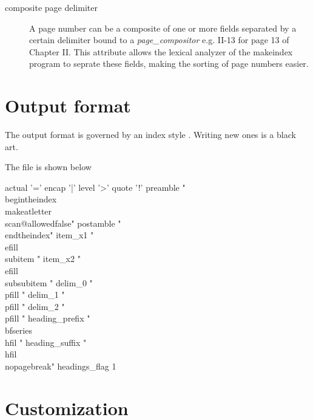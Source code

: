 \begin{description}

\item[composite page delimiter] A page number can be a composite of one or more fields separated by a certain delimiter bound to a \textit{page\_compositor}  e.g. II-13 for page 13 of Chapter II. This attribute allows the lexical analyzer of the makeindex program to seprate these fields, making the sorting of page numbers easier.
\end{description}


\section{Output format}

The output format is governed by an index style . Writing new ones is a black art.

The file  is shown below
\begin{teXXX}
actual '='
encap '|'
level '>'
quote '!'
preamble
"\n \\begin{theindex} \n \\makeatletter\\scan@allowedfalse\n"
postamble
"\n\n \\end{theindex}\n"
item_x1   "\\efill \n \\subitem "
item_x2   "\\efill \n \\subsubitem "
delim_0   "\\pfill "
delim_1   "\\pfill "
delim_2   "\\pfill "
heading_prefix   "{\\bfseries\\hfil "
heading_suffix   "\\hfil}\\nopagebreak\n"
headings_flag       1
\end{teXXX}


\section{Customization}

